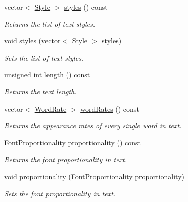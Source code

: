 \begin{CompactItemize}
vector$<$ \hyperlink{class_style}{Style} $>$ \hyperlink{class_text_a66bfa36621592ccbeda7968637d7301}{styles} () const 
\begin{CompactList}\small\item\em Returns the list of text styles. \item\end{CompactList}\item 
void \hyperlink{class_text_5782b92326b7e3c851c38f82cb412b70}{styles} (vector$<$ \hyperlink{class_style}{Style} $>$ styles)
\begin{CompactList}\small\item\em Sets the list of text styles. \item\end{CompactList}\item 
unsigned int \hyperlink{class_text_8d76db538f8617fb8880ba3e4ff3e6a5}{length} () const 
\begin{CompactList}\small\item\em Returns the text length. \item\end{CompactList}\item 
vector$<$ \hyperlink{_word_rate_8h_e8f43926daba5798edbb3cb94ad07ff7}{WordRate} $>$ \hyperlink{class_text_1c69ff1b2a6b1bfbf0b44fc4a185de3d}{wordRates} () const 
\begin{CompactList}\small\item\em Returns the appearance rates of every single word in text. \item\end{CompactList}\item 
\hyperlink{_font_proportionality_8h_a9aa255df24db58a9b4cbc46941f2ac1}{FontProportionality} \hyperlink{class_text_28df8a28b99fc925f6a9597a81769f62}{proportionality} () const 
\begin{CompactList}\small\item\em Returns the font proportionality in text. \item\end{CompactList}\item 
void \hyperlink{class_text_90ebca7fe222314f1c50c4e36559ca64}{proportionality} (\hyperlink{_font_proportionality_8h_a9aa255df24db58a9b4cbc46941f2ac1}{FontProportionality} proportionality)
\begin{CompactList}\small\item\em Sets the font proportionality in text. \item\end{CompactList}\end{CompactItemize}

